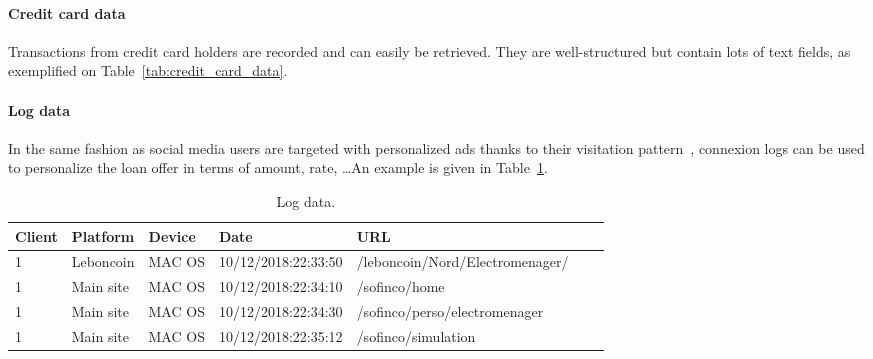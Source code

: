 \paragraph{Credit card data}

Transactions from credit card holders are recorded and can easily be retrieved. They are well-structured but contain lots of text fields, as exemplified on Table~\ref{tab:credit_card_data}.

\begin{table}[ht]
    \centering
    \caption{Daily per-client credit card data.}
    \label{tab:credit_card_data}
\begin{tiny}
\end{tiny}
\end{table}


\paragraph{Log data}

In the same fashion as social media users are targeted with personalized ads thanks to their visitation pattern~\cite{Yan:2017:YAY:3109859.3109923}, connexion logs can be used to personalize the loan offer in terms of amount, rate, \dots An example is given in Table~\ref{tab:log_data}.

\begin{table}[ht]
    \centering
    \caption{Log data.}
    \label{tab:log_data}
    \begin{small}
\begin{tabular}{lllllll}
Client & Platform & Device & Date & URL \\
 \hline
1 & Leboncoin & MAC OS & 10/12/2018:22:33:50 & /leboncoin/Nord/Electromenager/ \\
1 & Main site & MAC OS & 10/12/2018:22:34:10 & /sofinco/home \\
1 & Main site & MAC OS & 10/12/2018:22:34:30 & /sofinco/perso/electromenager \\
1 & Main site & MAC OS & 10/12/2018:22:35:12 & /sofinco/simulation \\
\end{tabular}
    \end{small}
\end{table}





